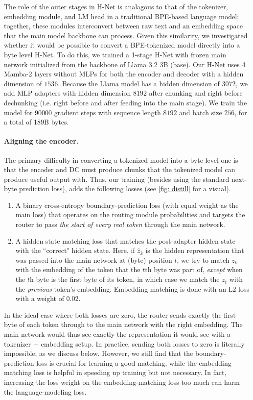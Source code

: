 \documentclass{article}
\newcommand{\model}{H-Net}
\newcommand{\main}{main network}
\newcommand{\router}{routing module}
\theoremstyle{plain}
\theoremstyle{remark}
\begin{document}
The role of the outer stages in \model{} is analagous to that of the tokenizer, embedding module, and LM head in a traditional BPE-based language model; together, these modules interconvert between raw text and an embedding space that the main model backbone can process.
Given this similarity, we investigated whether it would be possible to convert a BPE-tokenized model directly into a byte level \model{}.
To do this, we trained a 1-stage \model{} with frozen \main{} initialized from the backbone of Llama 3.2 3B (base).
Our \model{} uses 4 Mamba-2 layers without MLPs for both the encoder and decoder with a hidden dimension of $1536$.
Because the Llama model has a hidden dimension of $3072$, we add MLP adapters with hidden dimension $8192$ after chunking and right before dechunking (i.e. right before and after feeding into the main stage).
We train the model for 90000 gradient steps with sequence length $8192$ and batch size $256$, for a total of 189B bytes.

\paragraph{Aligning the encoder.} The primary difficulty in converting a tokenized model into a byte-level one is that the encoder and DC must produce chunks that the tokenized model can produce useful output with.
Thus, our training (besides using the standard next-byte prediction loss), adds the following losses (see \cref{fig: distill} for a visual).
\begin{enumerate}
    \item A binary cross-entropy boundary-prediction loss (with equal weight as the main loss) that operates on the \router{} probabilities and targets the router to pass \emph{the start of every real token} through the \main{}.
    \item A hidden state matching loss that matches the post-adapter hidden state with the ``correct" hidden state.
        Here, if $\hat z_k$ is the hidden representation that was passed into the \main{} at (byte) position $t$, we try to match $z_k$ with the embedding of the token that the $t$th byte was part of, \emph{except} when the $t$h byte is the first byte of its token, in which case we match the $z_t$ with the \emph{previous} token's embedding.
        Embedding matching is done with an L2 loss with a weight of 0.02.
\end{enumerate}

In the ideal case where both losses are zero, the router sends exactly the first byte of each token through to the \main{} with the right embedding.
The \main{} would thus see exactly the representation it would see with a tokenizer + embedding setup.
In practice, sending both losses to zero is literally impossible, as we discuss below.
However, we still find that the boundary-prediction loss is crucial for learning a good matching, while the embedding-matching loss is helpful in speeding up training but not necessary.
In fact, increasing the loss weight on the embedding-matching loss too much can harm the language-modeling loss.
\end{document}
